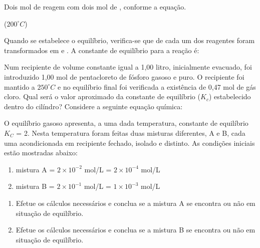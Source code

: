 \documentclass[a4paper,12]{exam}
\begin{document}
\begin{multicols}{2}
\begin{questions}
				\question Dois mol de  reagem com dois mol de , conforme a equação.
				\begin{center}
					 ($200^{\circ}C$)
				\end{center}
				Quando se estabelece o equilíbrio, verifica-se que  de cada um dos reagentes foram transformados em  e . A constante de equilíbrio para a reação é:
				\makeemptybox{2cm}

				\question Num recipiente de volume constante igual a 1,00 litro, inicialmente evacuado, foi introduzido 1,00 mol de pentacloreto de fósforo gasoso e puro. O recipiente foi mantido a $250^{\circ}C$ e no equilíbrio final foi verificada a existência de 0,47 mol de gás cloro. Qual será o valor aproximado da constante de equilíbrio ($K_c$) estabelecido dentro do cilíndro? Considere a seguinte equação química:
				\begin{center}
				\end{center}
				\makeemptybox{2cm}


				\question O equilíbrio gasoso  apresenta, a uma dada temperatura, constante de equilíbrio $K_C$ = 2. Nesta temperatura foram feitas duas misturas diferentes, A e B, cada uma acondicionada em recipiente fechado, isolado e distinto. As condições iniciais estão mostradas abaixo:
				\begin{enumerate}
				\item mistura A  = $2\times 10^{-2}$ mol/L  = $2\times 10^{-4}$ mol/L
				\item mistura B  = $2\times 10^{-1}$ mol/L  = $1\times 10^{-3}$ mol/L
					\end{enumerate}
				\begin{enumerate}[label=\alph*.]
					\item Efetue os cálculos necessários e conclua se a mistura A se encontra ou não em situação de equilíbrio.
					\item Efetue os cálculos necessários e conclua se a mistura B se encontra ou não em situação de equilíbrio.
				\end{enumerate}

				\question



\end{questions}
\end{multicols}
\end{document}
